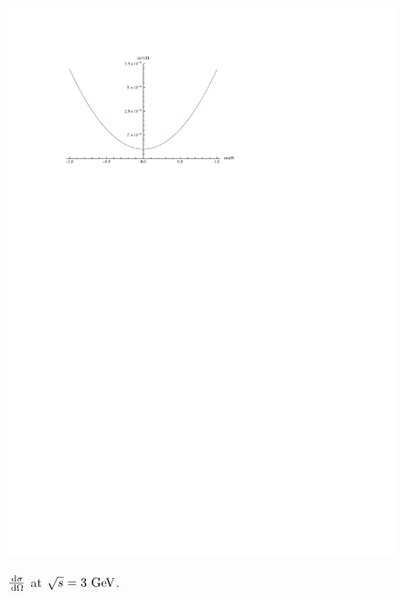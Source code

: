 \documentclass[]{article}
\begin{document}
\begin{figure}[H]
{		\includegraphics[scale=0.7]{sm_below}
	}
	\caption{$\frac{\,\operatorname{d}\!{\sigma}}{\,\operatorname{d}\!{\Omega}}$ at $\sqrt{s}=3\GeV$.}
	\label{fig:diffbelow}
\end{figure}
\end{document}
